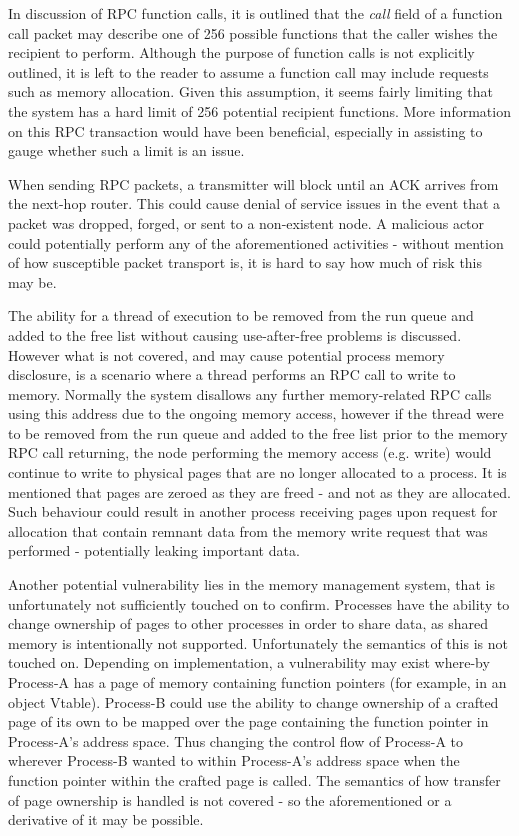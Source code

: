 \documentclass{article}
\begin{document}
In discussion of RPC function calls, it is outlined that the \textit{call} field of a function call packet may describe one of 256 possible functions that the caller wishes the recipient to perform. Although the purpose of function calls is not explicitly outlined, it is left to the reader to assume a function call may include requests such as memory allocation. Given this assumption, it seems fairly limiting that the system has a hard limit of 256 potential recipient functions. More information on this RPC transaction would have been beneficial, especially in assisting to gauge whether such a limit is an issue.

When sending RPC packets, a transmitter will block until an ACK arrives from the next-hop router. This could cause denial of service issues in the event that a packet was dropped, forged, or sent to a non-existent node. A malicious actor could potentially perform any of the aforementioned activities - without mention of how  susceptible packet transport is, it is hard to say how much of risk this may be.

The ability for a thread of execution to be removed from the run queue and added to the free list without causing use-after-free problems is discussed. However what is not covered, and may cause potential process memory disclosure, is a scenario where a thread performs an RPC call to write to memory. Normally the system disallows any further memory-related RPC calls using this address due to the ongoing memory access, however if the thread were to be removed from the run queue and added to the free list prior to the memory RPC call returning, the node performing the memory access (e.g. write) would continue to write to physical pages that are no longer allocated to a process. It is mentioned that pages are zeroed as they are freed - and not as they are allocated. Such behaviour could result in another process receiving pages upon request for allocation that contain remnant data from the memory write request that was performed - potentially leaking important data.

Another potential vulnerability lies in the memory management system, that is unfortunately not sufficiently touched on to confirm. Processes have the ability to change ownership of pages to other processes in order to share data, as shared memory is intentionally not supported. Unfortunately the semantics of this is not touched on. Depending on implementation, a vulnerability may exist where-by Process-A has a page of memory containing function pointers (for example, in an object Vtable). Process-B could use the ability to change ownership of a crafted page of its own to be mapped over the page containing the function pointer in Process-A's address space. Thus changing the control flow of Process-A to wherever Process-B wanted to within Process-A's address space when the function pointer within the crafted page is called. The semantics of how transfer of page ownership is handled is not covered - so the aforementioned or a derivative of it may be possible.
\end{document}
